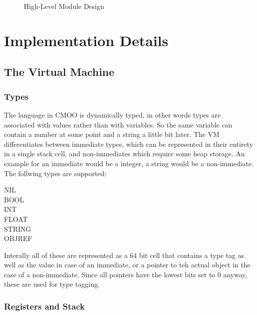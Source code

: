 \documentclass[12pt,a4paper]{article}
\begin{document}
\begin{figure}[htb]
\centering

\caption{High-Level Module Design}
\end{figure}

\section{Implementation Details}\label{sec:implementation_details}

\subsection{The Virtual Machine}\label{sec:virtual_machine}

\subsubsection{Types}\label{sec:types}

The language in CMOO is dynamically typed, in other words types are associated with values rather than with variables. So the same variable can contain a number at some point and a string a little bit later. The VM differentiates between immediate types, which can be represented in their entirety in a single stack cell, and non-immediates which require some heap storage. An example for an immediate would be a integer, a string would be a non-immediate. The follwing types are supported:

\begin{description}
\item[NIL]
\item[BOOL]
\item[INT]
\item[FLOAT]
\item[STRING]
\item[OBJREF]
\end{description}

Interally all of these are represented as a 64 bit cell that contains a type tag as well as the value in case of an immediate, or a pointer to teh actual object in the case of a non-immediate. Since all pointers have the lowest bits set to 0 anyway, these are used for type tagging.

\subsubsection{Registers and Stack}\label{sec:stack}
\end{document}
